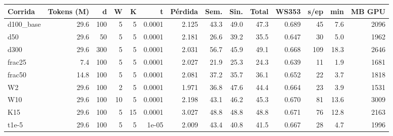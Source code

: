 \begin{tabular}{lrrrrrrrrrrrrr}
\toprule
Corrida & Tokens (M) & d & W & K & t & Pérdida & Sem. & Sin. & Total & WS353 & s/ep & min & MB GPU \\
\midrule
d100\_base & 29.6 & 100 & 5 & 5 & 0.0001 & 2.125 & 43.3 & 49.0 & 47.3 & 0.689 & 45 & 7.6 & 2096 \\
d50 & 29.6 & 50 & 5 & 5 & 0.0001 & 2.181 & 26.6 & 39.2 & 35.5 & 0.647 & 30 & 5.0 & 1962 \\
d300 & 29.6 & 300 & 5 & 5 & 0.0001 & 2.031 & 56.7 & 45.9 & 49.1 & 0.668 & 109 & 18.3 & 2646 \\
frac25 & 7.4 & 100 & 5 & 5 & 0.0001 & 2.027 & 21.9 & 25.3 & 24.3 & 0.639 & 11 & 1.9 & 1681 \\
frac50 & 14.8 & 100 & 5 & 5 & 0.0001 & 2.081 & 37.2 & 35.7 & 36.1 & 0.652 & 22 & 3.7 & 1818 \\
W2 & 29.6 & 100 & 2 & 5 & 0.0001 & 1.971 & 36.8 & 47.6 & 44.4 & 0.664 & 23 & 3.9 & 1531 \\
W10 & 29.6 & 100 & 10 & 5 & 0.0001 & 2.198 & 43.1 & 46.2 & 45.3 & 0.670 & 81 & 13.6 & 3009 \\
K15 & 29.6 & 100 & 5 & 15 & 0.0001 & 3.027 & 48.8 & 48.8 & 48.8 & 0.671 & 76 & 12.8 & 2163 \\
t1e-5 & 29.6 & 100 & 5 & 5 & 1e-05 & 2.009 & 43.4 & 40.8 & 41.5 & 0.667 & 28 & 4.7 & 1996 \\
\bottomrule
\end{tabular}